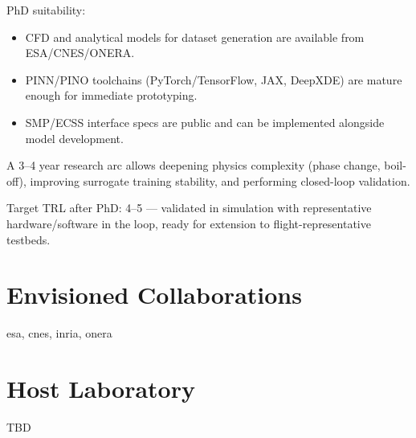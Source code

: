 \documentclass[12pt]{article}
\begin{document}
	PhD suitability:
	
	\begin{itemize}
		\item CFD and analytical models for dataset generation are available from ESA/CNES/ONERA.
		
		\item PINN/PINO toolchains (PyTorch/TensorFlow, JAX, DeepXDE) are mature enough for immediate prototyping.
		
		\item SMP/ECSS interface specs are public and can be implemented alongside model development.
		
	\end{itemize}	
	A 3–4 year research arc allows deepening physics complexity (phase change, boil-off), improving surrogate training stability, and performing closed-loop validation.
	
	Target TRL after PhD: 4–5 — validated in simulation with representative hardware/software in the loop, ready for extension to flight-representative testbeds.
	
	
	
	\nocite{*}
	
	\printbibliography[title=Indicative Bibliography]
	
	\section*{Envisioned Collaborations}
	
	\acrshort{esa}, \acrshort{cnes}, \acrshort{inria}, \acrshort{onera}
	
	\section*{Host Laboratory}
	
	TBD
	
	\printglossaries
	
\end{document}
